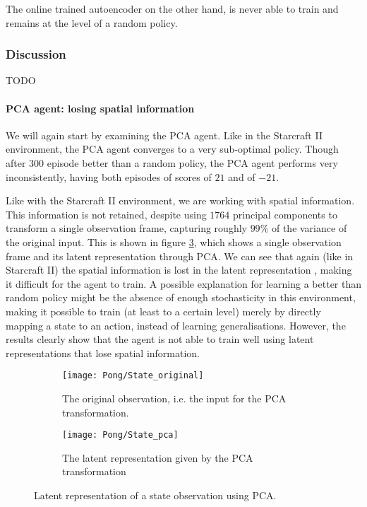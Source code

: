 The online trained autoencoder on the other hand, is never able to train and remains at the level of a random policy.

\subsubsection{Discussion}\label{research-discussion-pong}
TODO
\paragraph{PCA agent: losing spatial information}
We will again start by examining the PCA agent. Like in the Starcraft II environment, the PCA agent converges to a very sub-optimal policy. Though after $300$ episode better than a random policy, the PCA agent performs very inconsistently, having both episodes of scores of $21$ and of $-21$.

Like with the Starcraft II environment, we are working with spatial information. This information is not retained, despite using $1764$ principal components to transform a single observation frame, capturing roughly $99\%$ of the variance of the original input. This is shown in figure \ref{fig:pca-state-pong}, which shows a single observation frame and its latent representation through PCA. We can see that again (like in Starcraft II) the spatial information is lost in the latent representation , making it difficult for the agent to train. A possible explanation for learning a better than random policy might be the absence of enough stochasticity in this environment, making it possible to train (at least to a certain level) merely by directly mapping a state to an action, instead of learning generalisations. However, the results clearly show that the agent is not able to train well using latent representations that lose spatial information.


\begin{figure}[h!]
	\centering
	\begin{subfigure}[b]{0.75\textwidth}
		\texttt{[image: Pong/State\_original]}
		\caption{The original observation, i.e. the input for the PCA transformation.}
		\label{fig:pca-original-pong} 
	\end{subfigure}
	\begin{subfigure}[b]{0.75\textwidth}
		\texttt{[image: Pong/State\_pca]}
		\caption{The latent representation given by the PCA transformation}
		\label{fig:pca-latent-pong}
	\end{subfigure}
	\caption{Latent representation of a state observation using PCA.}
	\label{fig:pca-state-pong}
\end{figure}

